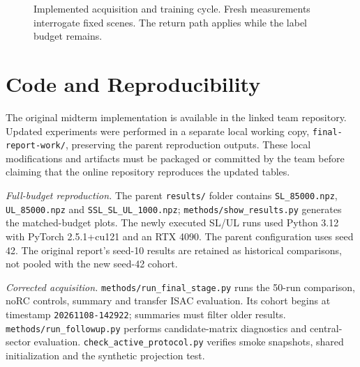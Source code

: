 \documentclass[conference]{IEEEtran}
\begin{document}
\begin{figure}[!htb]\centering
{}
\caption{Implemented acquisition and training cycle. Fresh measurements interrogate fixed scenes. The return path applies while the label budget remains.}\label{fig:workflow}
\end{figure}

\section{Code and Reproducibility}
The original midterm implementation is available in the linked team repository. Updated experiments were performed in a separate local working copy, \texttt{final-report-work/}, preserving the parent reproduction outputs. These local modifications and artifacts must be packaged or committed by the team before claiming that the online repository reproduces the updated tables.

\emph{Full-budget reproduction.} The parent \texttt{results/} folder contains \texttt{SL\_85000.npz}, \texttt{UL\_85000.npz} and \texttt{SSL\_SL\_UL\_1000.npz}; \texttt{methods/show\_results.py} generates the matched-budget plots. The newly executed SL/UL runs used Python 3.12 with PyTorch 2.5.1+cu121 and an RTX 4090. The parent configuration uses seed 42. The original report's seed-10 results are retained as historical comparisons, not pooled with the new seed-42 cohort.

\emph{Corrected acquisition.} \texttt{methods/run\_final\_stage.py} runs the 50-run comparison, noRC controls, summary and transfer ISAC evaluation. Its cohort begins at timestamp \texttt{20261108-142922}; summaries must filter older results. \texttt{methods/run\_followup.py} performs candidate-matrix diagnostics and central-sector evaluation. \texttt{check\_active\_protocol.py} verifies smoke snapshots, shared initialization and the synthetic projection test.
\end{document}
